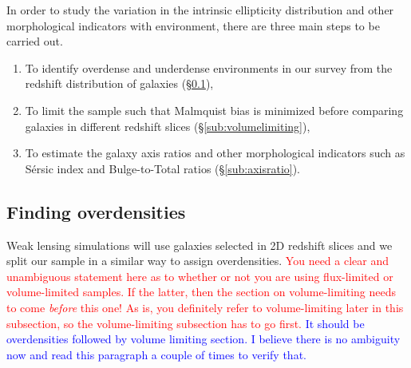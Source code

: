 \documentclass[twocolumn,useAMS,usenatbib]{mn2e}
\newcommand{\rachel}[1]{{\textcolor{red}{#1}}}
\newcommand{\arun}[1]{{\textcolor{blue}{#1}}}
\newcommand{\sersic}{S\'{e}rsic }
\begin{document}
In order to study the variation in the intrinsic ellipticity distribution and other morphological indicators with environment, there are three main steps to be carried out.
\begin{enumerate}
 \item To identify overdense and underdense environments in our survey from the redshift distribution of galaxies (\S\ref{sub:overdensities}),
 \item To limit the sample such that Malmquist bias is minimized before comparing galaxies in different redshift slices (\S\ref{sub:volumelimiting}),
 \item To estimate the galaxy axis ratios and other morphological indicators such as  \sersic index and Bulge-to-Total ratios (\S\ref{sub:axisratio}).
\end{enumerate}


\subsection{Finding overdensities}
\label{sub:overdensities}


Weak lensing simulations will use galaxies selected in 2D redshift slices and
we split our sample in a similar way to assign overdensities.
\rachel{You need a clear and unambiguous statement here as to whether
  or not you are using flux-limited or volume-limited samples.  If the
  latter, then the section on volume-limiting needs to come {\em
    before} this one!  As is, you definitely refer to volume-limiting
  later in this subsection, so the volume-limiting subsection has to
  go first.}
\arun{It should be overdensities followed by volume limiting section. I believe there is no ambiguity now and read this paragraph a couple of times to verify that.}  
\end{document}
